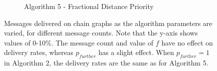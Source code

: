 \documentclass[bsc,frontabs,twoside,singlespacing,parskip,deptreport]{infthesis}     %
\begin{document}
\begin{figure}[]
\begin{subfigure}[]{0.40\textwidth}
\caption{Algorithm 5 - Fractional Distance Priority}
\end{subfigure}
\caption{Messages delivered on chain graphs as the algorithm parameters are varied, for different message counts. Note that the y-axis shows values of 0-10\%. The message count and value of $f$ have no effect on delivery rates, whereas $p_{further}$ has a slight effect. When $p_{further}=1$ in Algorithm 2, the delivery rates are the same as for Algorithm 5.}
\label{fig:chain_params}
\end{figure}
\end{document}

